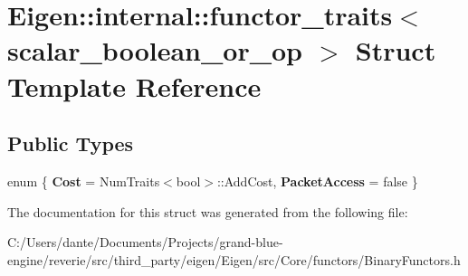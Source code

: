 \hypertarget{struct_eigen_1_1internal_1_1functor__traits_3_01scalar__boolean__or__op_01_4}{}\section{Eigen\+::internal\+::functor\+\_\+traits$<$ scalar\+\_\+boolean\+\_\+or\+\_\+op $>$ Struct Template Reference}
\label{struct_eigen_1_1internal_1_1functor__traits_3_01scalar__boolean__or__op_01_4}
\subsection*{Public Types}
\begin{DoxyCompactItemize}
\item 
\mbox{\label{struct_eigen_1_1internal_1_1functor__traits_3_01scalar__boolean__or__op_01_4_af2e9dc19fc726551db9b71b191ba04de}} 
enum \{ {\bfseries Cost} = Num\+Traits$<$bool$>$\+::Add\+Cost, 
{\bfseries Packet\+Access} = false
 \}
\end{DoxyCompactItemize}


The documentation for this struct was generated from the following file\+:\begin{DoxyCompactItemize}
\item 
C\+:/\+Users/dante/\+Documents/\+Projects/grand-\/blue-\/engine/reverie/src/third\+\_\+party/eigen/\+Eigen/src/\+Core/functors/Binary\+Functors.\+h\end{DoxyCompactItemize}
